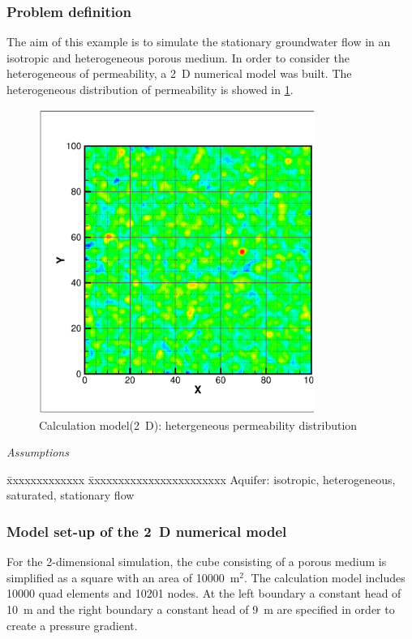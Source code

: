 
\subsubsection*{Problem definition}

The aim of this example is to simulate the stationary groundwater flow in an isotropic and heterogeneous porous medium. In order to consider the heterogeneous of permeability, a 2~D numerical model was built. The heterogeneous distribution of permeability is showed in \ref{KDis}.
\begin{figure}[htbp]
\centering
\includegraphics[width=0.8\textwidth]{H_GW/figures/KDis.eps}
\caption{Calculation model(2~D): hetergeneous permeability distribution}
\label{KDis}
\end{figure}

\textsl{Assumptions}

\begin{tabbing}
\=xxxxxxxxxxxxx  \=xxxxxxxxxxxxxxxxxxxxxxx \kill
\> Aquifer: \> isotropic, heterogeneous, saturated, stationary flow
\end{tabbing}

\subsubsection*{Model set-up of the 2~D numerical model}

For the 2-dimensional simulation, the cube consisting of a porous medium is simplified as a square with an area of 10000~m$^2$. The calculation model includes 10000 quad elements and 10201 nodes. At the left boundary  a constant head of 10~m and the right boundary  a constant head of 9~m are specified in order to create a pressure gradient. 

